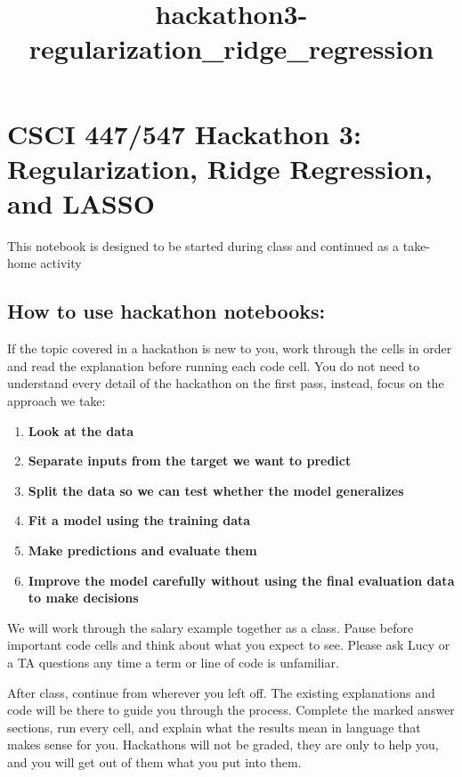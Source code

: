 \documentclass[11pt]{article}
\title{hackathon3-regularization\_ridge\_regression}
\providecommand{\tightlist}{%
      \setlength{\itemsep}{0pt}\setlength{\parskip}{0pt}}
\begin{document}
    
    \maketitle
    
    

    
    \section{CSCI 447/547 Hackathon 3: Regularization, Ridge Regression, and
LASSO}\label{csci-447547-hackathon-3-regularization-ridge-regression-and-lasso}

This notebook is designed to be started during class and continued as a
take-home activity

\subsection{How to use hackathon
notebooks:}\label{how-to-use-hackathon-notebooks}

If the topic covered in a hackathon is new to you, work through the
cells in order and read the explanation before running each code cell.
You do not need to understand every detail of the hackathon on the first
pass, instead, focus on the approach we take:

\begin{enumerate}
\def\labelenumi{\arabic{enumi}.}
\tightlist
\item
  \textbf{Look at the data}
\item
  \textbf{Separate inputs from the target we want to predict}
\item
  \textbf{Split the data so we can test whether the model generalizes}
\item
  \textbf{Fit a model using the training data}
\item
  \textbf{Make predictions and evaluate them}
\item
  \textbf{Improve the model carefully without using the final evaluation
  data to make decisions}
\end{enumerate}

We will work through the salary example together as a class. Pause
before important code cells and think about what you expect to see.
Please ask Lucy or a TA questions any time a term or line of code is
unfamiliar.

After class, continue from wherever you left off. The existing
explanations and code will be there to guide you through the process.
Complete the marked answer sections, run every cell, and explain what
the results mean in language that makes sense for you. Hackathons will
not be graded, they are only to help you, and you will get out of them
what you put into them.
\end{document}
